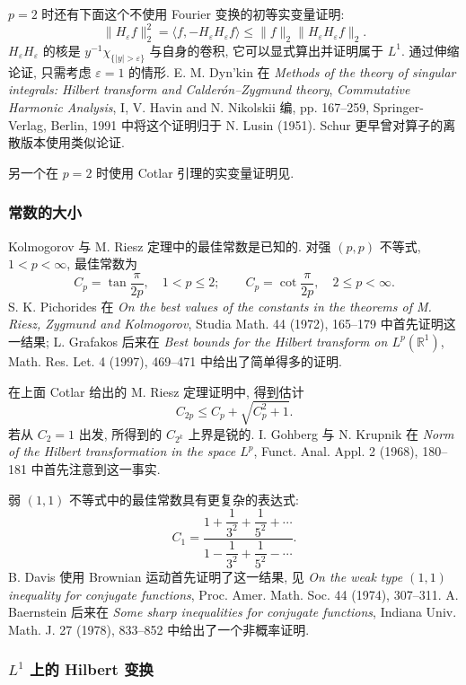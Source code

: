 $p=2$ 时还有下面这个不使用 Fourier 变换的初等实变量证明:
\[
 \|H_\varepsilon f\|_2^2
 =\langle f,-H_\varepsilon H_\varepsilon f\rangle
 \le\|f\|_2\|H_\varepsilon H_\varepsilon f\|_2.
\]
$H_\varepsilon H_\varepsilon$ 的核是 $y^{-1}\chi_{\{|y|>\varepsilon\}}$ 与自身的卷积, 它可以显式算出并证明属于 $L^1$. 通过伸缩论证, 只需考虑 $\varepsilon=1$ 的情形. E. M. Dyn'kin 在 \emph{Methods of the theory of singular integrals: Hilbert transform and Calderón--Zygmund theory}, \emph{Commutative Harmonic Analysis}, I, V. Havin and N. Nikolskii 编, pp. 167--259, Springer-Verlag, Berlin, 1991 中将这个证明归于 N. Lusin (1951). Schur 更早曾对算子的离散版本使用类似论证.

另一个在 $p=2$ 时使用 Cotlar 引理的实变量证明见.

\subsubsection{常数的大小}
\label{subsec:ch3-size-of-constants}

Kolmogorov 与 M. Riesz 定理中的最佳常数是已知的. 对强 $(p,p)$ 不等式, $1<p<\infty$, 最佳常数为
\[
 C_p=\tan\frac{\pi}{2p},\quad1<p\le2;
 \qquad
 C_p=\cot\frac{\pi}{2p},\quad2\le p<\infty.
\]
S. K. Pichorides 在 \emph{On the best values of the constants in the theorems of M. Riesz, Zygmund and Kolmogorov}, Studia Math. 44 (1972), 165--179 中首先证明这一结果; L. Grafakos 后来在 \emph{Best bounds for the Hilbert transform on $L^p(\mathbb R^1)$}, Math. Res. Let. 4 (1997), 469--471 中给出了简单得多的证明.

在上面 Cotlar 给出的 M. Riesz 定理证明中, 得到估计
\[
 C_{2p}\le C_p+\sqrt{C_p^2+1}.
\]
若从 $C_2=1$ 出发, 所得到的 $C_{2^k}$ 上界是锐的. I. Gohberg 与 N. Krupnik 在 \emph{Norm of the Hilbert transformation in the space $L^p$}, Funct. Anal. Appl. 2 (1968), 180--181 中首先注意到这一事实.

\hypertarget{chapter-03-page-077}{}
弱 $(1,1)$ 不等式中的最佳常数具有更复杂的表达式:
\[
 C_1=\frac{1+\dfrac1{3^2}+\dfrac1{5^2}+\cdots}
 {1-\dfrac1{3^2}+\dfrac1{5^2}-\cdots}.
\]
B. Davis 使用 Brownian 运动首先证明了这一结果, 见 \emph{On the weak type $(1,1)$ inequality for conjugate functions}, Proc. Amer. Math. Soc. 44 (1974), 307--311. A. Baernstein 后来在 \emph{Some sharp inequalities for conjugate functions}, Indiana Univ. Math. J. 27 (1978), 833--852 中给出了一个非概率证明.

\subsubsection{$L^1$ 上的 Hilbert 变换}
\label{subsec:ch3-hilbert-l1}

